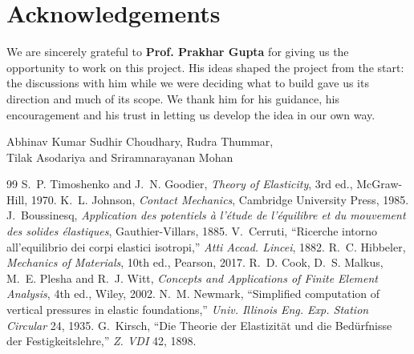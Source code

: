 \section*{Acknowledgements}
We are sincerely grateful to \textbf{Prof. Prakhar Gupta} for giving us the opportunity to work on this project. His ideas shaped the project from the start: the discussions with him while we were deciding what to build gave us its direction and much of its scope. We thank him for his guidance, his encouragement and his trust in letting us develop the idea in our own way.

\begin{flushright}
\sffamily Abhinav Kumar Sudhir Choudhary, Rudra Thummar,\\ Tilak Asodariya and Sriramnarayanan Mohan
\end{flushright}

\begin{thebibliography}{99}\small
{} S.~P. Timoshenko and J.~N. Goodier, \emph{Theory of Elasticity}, 3rd ed., McGraw-Hill, 1970.
 K.~L. Johnson, \emph{Contact Mechanics}, Cambridge University Press, 1985.
 J.~Boussinesq, \emph{Application des potentiels \`a l'\'etude de l'\'equilibre et du mouvement des solides \'elastiques}, Gauthier-Villars, 1885.
 V.~Cerruti, ``Ricerche intorno all'equilibrio dei corpi elastici isotropi,'' \emph{Atti Accad. Lincei}, 1882.
 R.~C. Hibbeler, \emph{Mechanics of Materials}, 10th ed., Pearson, 2017.
 R.~D. Cook, D.~S. Malkus, M.~E. Plesha and R.~J. Witt, \emph{Concepts and Applications of Finite Element Analysis}, 4th ed., Wiley, 2002.
 N.~M. Newmark, ``Simplified computation of vertical pressures in elastic foundations,'' \emph{Univ. Illinois Eng. Exp. Station Circular} 24, 1935.
 G.~Kirsch, ``Die Theorie der Elastizit\"at und die Bed\"urfnisse der Festigkeitslehre,'' \emph{Z. VDI} 42, 1898.
\end{thebibliography}
